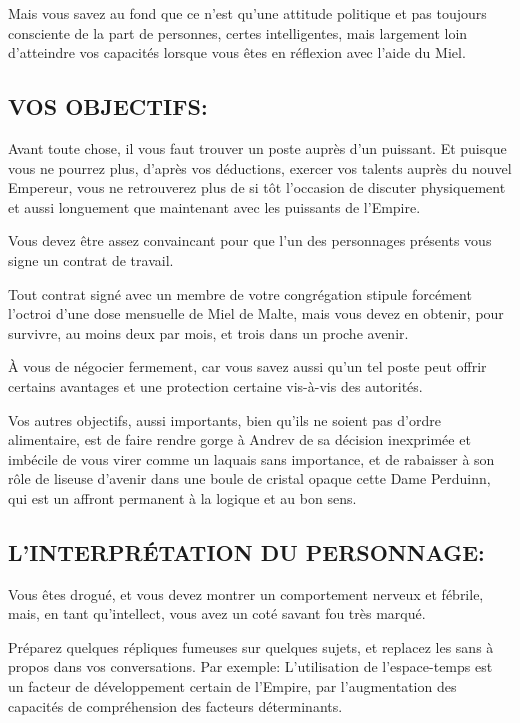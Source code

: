 \documentclass[14pt,twocolumn]{extarticle}
\begin{document}
Mais vous savez au fond que ce n'est qu'une attitude politique et pas toujours
consciente de la part de personnes, certes intelligentes, mais largement loin
d'atteindre vos capacités lorsque vous êtes en \og réflexion\fg{} avec l'aide
du Miel.

\subsection{VOS OBJECTIFS:}

Avant toute chose, il vous faut trouver un poste auprès d'un puissant. Et
puisque vous ne pourrez plus, d'après vos déductions, exercer vos talents
auprès du nouvel Empereur, vous ne retrouverez plus de si tôt l'occasion de
discuter physiquement et aussi longuement que maintenant avec les puissants de
l'Empire.

Vous devez être assez convaincant pour que l'un des personnages présents vous
signe un contrat de travail.

Tout contrat signé avec un membre de votre congrégation stipule forcément
l'octroi d'une dose mensuelle de Miel de Malte, mais vous devez en obtenir,
pour survivre, au moins deux par mois, et trois dans un proche avenir.

À vous de négocier fermement, car vous savez aussi qu'un tel poste peut offrir
certains avantages et une protection certaine vis-à-vis des autorités.

Vos autres objectifs, aussi importants, bien qu'ils ne soient pas d'ordre
alimentaire, est de faire rendre gorge à Andrev de sa décision inexprimée et
imbécile de vous virer comme un laquais sans importance, et de rabaisser à son
rôle de liseuse d'avenir dans une boule de cristal opaque cette Dame Perduinn,
qui est un affront permanent à la logique et au bon sens.

\subsection{L'INTERPRÉTATION DU PERSONNAGE:}

Vous êtes drogué, et vous devez montrer un comportement nerveux et fébrile,
mais, en tant qu'intellect, vous avez un coté savant fou très marqué.

Préparez quelques répliques fumeuses sur quelques sujets, et replacez les sans
à propos dans vos conversations. Par exemple: \og L'utilisation de
l'espace-temps est un facteur de développement certain de l'Empire, par
l'augmentation des capacités de compréhension des facteurs déterminants.\fg{}
\end{document}
